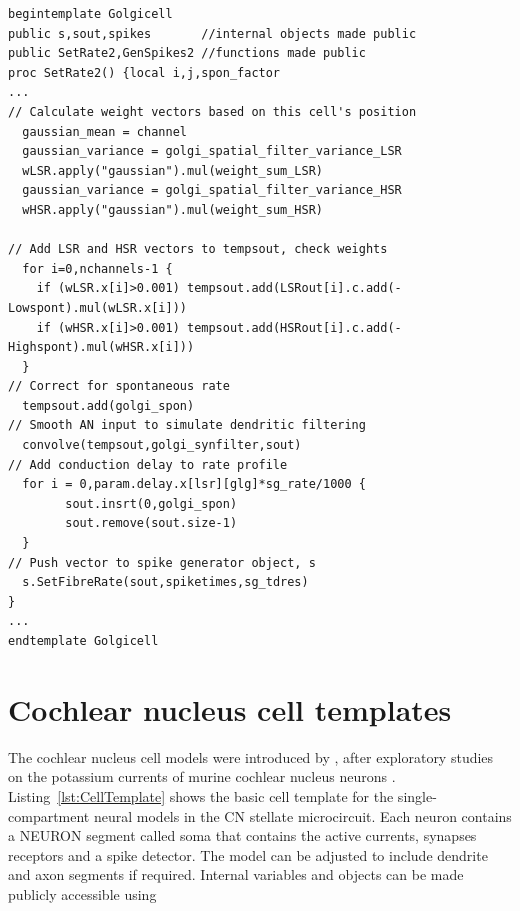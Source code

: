 \begin{lstlisting}[label=lst:GolgiTemplate,caption=Rate-based golgi cell model
  template (in par\_CNcell.tem)]
begintemplate Golgicell
public s,sout,spikes       //internal objects made public   
public SetRate2,GenSpikes2 //functions made public
proc SetRate2() {local i,j,spon_factor
...
// Calculate weight vectors based on this cell's position 
  gaussian_mean = channel
  gaussian_variance = golgi_spatial_filter_variance_LSR
  wLSR.apply("gaussian").mul(weight_sum_LSR)
  gaussian_variance = golgi_spatial_filter_variance_HSR
  wHSR.apply("gaussian").mul(weight_sum_HSR)

// Add LSR and HSR vectors to tempsout, check weights 
  for i=0,nchannels-1 {
    if (wLSR.x[i]>0.001) tempsout.add(LSRout[i].c.add(-Lowspont).mul(wLSR.x[i]))
    if (wHSR.x[i]>0.001) tempsout.add(HSRout[i].c.add(-Highspont).mul(wHSR.x[i]))
  }
// Correct for spontaneous rate 
  tempsout.add(golgi_spon)
// Smooth AN input to simulate dendritic filtering 
  convolve(tempsout,golgi_synfilter,sout)
// Add conduction delay to rate profile 
  for i = 0,param.delay.x[lsr][glg]*sg_rate/1000 {
        sout.insrt(0,golgi_spon)
        sout.remove(sout.size-1)
  }
// Push vector to spike generator object, s 
  s.SetFibreRate(sout,spiketimes,sg_tdres)
}
...
endtemplate Golgicell
\end{lstlisting}


\section{Cochlear nucleus cell templates}

The cochlear nucleus cell models were introduced by \citet{RothmanManis:2003b},
after exploratory studies on the potassium currents of murine cochlear nucleus
neurons \citep{RothmanManis:2003,RothmanManis:2003a}.
Listing~\ref{lst:CellTemplate} shows the basic cell template for the
single-compartment neural models in the CN stellate microcircuit.  Each neuron
contains a NEURON segment called soma that contains the active currents,
synapses receptors and a spike detector. The model can be adjusted to include
dendrite and axon segments if required. Internal variables and objects can be made publicly accessible using  

